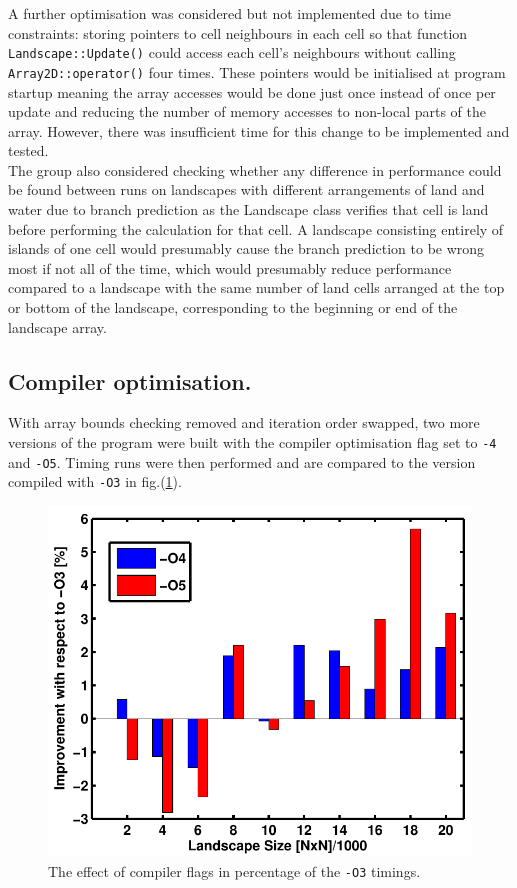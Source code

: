 A further optimisation was considered but not implemented due to time constraints: storing pointers to cell neighbours in each cell so that function \texttt{Landscape::Update()} could access each cell's neighbours without calling \texttt{Array2D::operator()} four times.
These pointers would be initialised at program startup meaning the array accesses would be done just once instead of once per update and reducing the number of memory accesses to non-local parts of the array.
However, there was insufficient time for this change to be implemented and tested.\\

The group also considered checking whether any difference in performance could be found between runs on landscapes with different arrangements of land and water due to branch prediction as the Landscape class verifies that cell is land before performing the calculation for that cell.
A landscape consisting entirely of islands of one cell would presumably cause the branch prediction to be wrong most if not all of the time, which would presumably reduce performance compared to a landscape with the same number of land cells arranged at the top or bottom of the landscape, corresponding to the beginning or end of the landscape array.


\subsection{Compiler optimisation.}
\label{Compiler optimisation}

With array bounds checking removed and iteration order swapped, two more versions of the program were built with the compiler optimisation flag set to \texttt{-4} and \texttt{-O5}.
Timing runs were then performed and are compared to the version compiled with \texttt{-O3} in fig.(\ref{fig: Comp flags bahart}).

\begin{figure}
 \includegraphics[scale=0.8]{Figures/Timing_Barchart_compflags.pdf}
\caption{The effect of compiler flags in percentage of the \texttt{-O3} timings.}
\label{fig: Comp flags bahart}
\end{figure}

